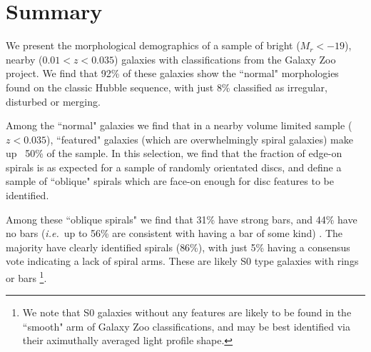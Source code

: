 \documentclass[usenatbib]{mn2e}
\newcommand{\ie}{{\it i.e.}}
\newcommand{\comment}[2][todo]{{\color{#1}[[{\bf #2}]]}}
\begin{document}


\section{Summary}

We present the morphological demographics of a sample of bright ($M_r <-19$), nearby ($0.01<z<0.035$) galaxies with classifications from the Galaxy Zoo project. We find that {92\%} of these galaxies show the ``normal" morphologies found on the classic Hubble sequence, with just {8\%} classified as irregular, disturbed or merging. 

Among the ``normal" galaxies we find that in a nearby volume limited sample ($z<0.035$), ``featured" galaxies (which are overwhelmingly spiral galaxies) make up ~50\% of the sample. In this selection, we find that the fraction of edge-on spirals is as expected for a sample of randomly orientated discs, and define a sample of ``oblique" spirals which are face-on enough for disc features to be identified. 

 Among these ``oblique spirals" we find that {31\%} have strong bars, and {44\%} have no bars (\ie ~up to 56\% are consistent with having a bar of some kind) . The majority have clearly identified spirals ({86\%}), with just {5\%} having a consensus vote indicating a lack of spiral arms. These are likely S0 type galaxies with rings or bars \footnote{We note that S0 galaxies without any features are likely to be found in the ``smooth" arm of Galaxy Zoo classifications, and may be best identified via their aximuthally averaged light profile shape.}. 
 
\end{document}
